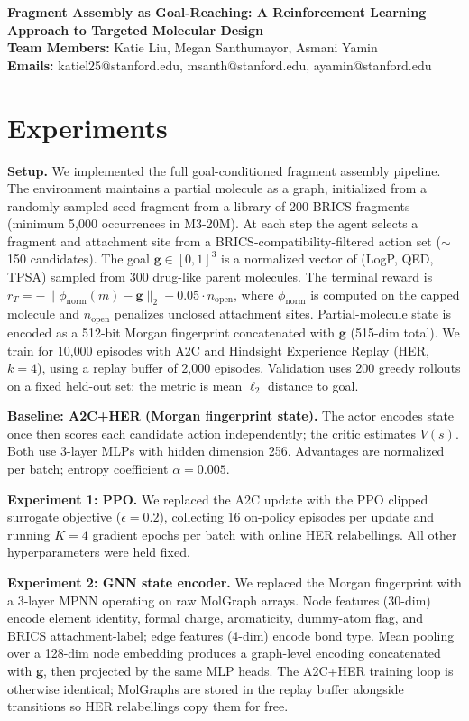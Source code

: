\documentclass{article}
\makeatletter
\renewcommand{\maketitle}{
  \begin{center}
    {\bf \large Fragment Assembly as Goal-Reaching: A Reinforcement Learning Approach to Targeted Molecular Design}\\
    \vspace{0.1cm}
    {\bf Team Members:} Katie Liu, Megan Santhumayor, Asmani Yamin\\
    \vspace{0.1cm}
    {\bf Emails:} katiel25@stanford.edu, msanth@stanford.edu, ayamin@stanford.edu\\
    \vspace{0.2cm}
  \end{center}
}
\makeatother
\begin{document}
\maketitle

\section{Experiments}

\textbf{Setup.}
We implemented the full goal-conditioned fragment assembly pipeline.
The environment maintains a partial molecule as a graph, initialized from a randomly sampled seed fragment from a library of 200 BRICS fragments (minimum 5{,}000 occurrences in M3-20M).
At each step the agent selects a fragment and attachment site from a BRICS-compatibility-filtered action set ($\sim$150 candidates).
The goal $\mathbf{g} \in [0,1]^3$ is a normalized vector of (LogP, QED, TPSA) sampled from 300 drug-like parent molecules.
The terminal reward is $r_T = -\|\phi_{\mathrm{norm}}(m) - \mathbf{g}\|_2 - 0.05 \cdot n_{\mathrm{open}}$, where $\phi_{\mathrm{norm}}$ is computed on the capped molecule and $n_{\mathrm{open}}$ penalizes unclosed attachment sites.
Partial-molecule state is encoded as a 512-bit Morgan fingerprint concatenated with $\mathbf{g}$ (515-dim total).
We train for 10{,}000 episodes with A2C and Hindsight Experience Replay (HER, $k{=}4$), using a replay buffer of 2{,}000 episodes.
Validation uses 200 greedy rollouts on a fixed held-out set; the metric is mean $\ell_2$ distance to goal.

\textbf{Baseline: A2C+HER (Morgan fingerprint state).}
The actor encodes state once then scores each candidate action independently; the critic estimates $V(s)$.
Both use 3-layer MLPs with hidden dimension 256.
Advantages are normalized per batch; entropy coefficient $\alpha = 0.005$.

\textbf{Experiment 1: PPO.}
We replaced the A2C update with the PPO clipped surrogate objective ($\epsilon{=}0.2$), collecting 16 on-policy episodes per update and running $K{=}4$ gradient epochs per batch with online HER relabellings.
All other hyperparameters were held fixed.

\textbf{Experiment 2: GNN state encoder.}
We replaced the Morgan fingerprint with a 3-layer MPNN operating on raw MolGraph arrays.
Node features (30-dim) encode element identity, formal charge, aromaticity, dummy-atom flag, and BRICS attachment-label; edge features (4-dim) encode bond type.
Mean pooling over a 128-dim node embedding produces a graph-level encoding concatenated with $\mathbf{g}$, then projected by the same MLP heads.
The A2C+HER training loop is otherwise identical; MolGraphs are stored in the replay buffer alongside transitions so HER relabellings copy them for free.
\end{document}
